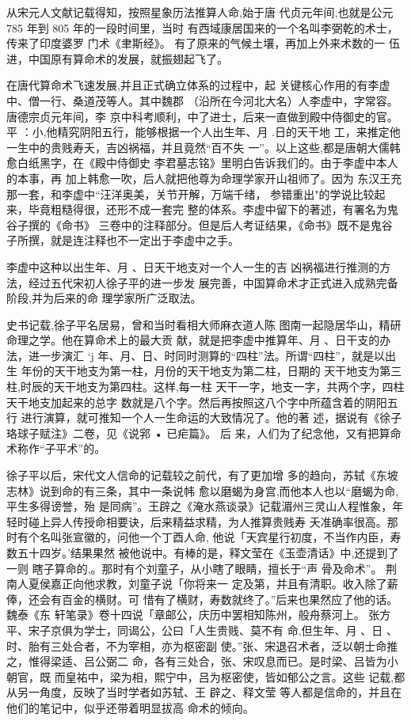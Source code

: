 从宋元人文献记载得知，按照星象历法推算人命,始于唐
代贞元年间,也就是公元 785 年到 805 年的一段时间里，当时
有西域康居国来的一个名叫李弼乾的术士，传来了印度婆罗
门术《聿斯经》。 有了原来的气候土壤，再加上外来术数的一
伍进，中国原有算命术的发展，就振翅起飞了。

在唐代算命术飞速发展,并且正式确立体系的过程中，起
关键核心作用的有李虚中、僧一行、桑道茂等人。其中魏郡
（沿所在今河北大名）人李虚中，字常容。唐德宗贞元年间，李
京中科考顺利，中了进士，后来一直做到殿中侍御史的官。平
：小,他精究阴阳五行，能够根据一个人出生年、月 .日的天干地
工，来推定他一生中的贵贱寿夭，吉凶祸福，并且竟然“百不失
一”。以上这些,都是唐朝大儒韩愈白纸黑字，在《殿中侍御史
李君墓志铭》里明白告诉我们的。由于李虚中本人的本事，再
加上韩愈一吹，后人就把他尊为命理学家开山祖师了。因为
东汉王充那一套，和李虚中“汪洋奥美，关节开解，万端千绪，
参错重出"的学说比较起来，毕竟粗糙得很，还形不成一套完
整的体系。李虚中留下的著述，有署名为鬼谷子撰的《命书》
三卷中的注释部分。但是后人考证结果，《命书》既不是鬼谷
子所撰，就是连注释也不一定出于李虚中之手。

李虚中这种以出生年、月 、日天干地支对一个人一生的吉
凶祸福进行推测的方法，经过五代宋初人徐子平的进一步发
展完善，中国算命术才正式进入成熟完备阶段,并为后来的命
理学家所广泛取法。

史书记载,徐子平名居易，曾和当时看相大师麻衣道人陈
图南一起隐居华山，精研命理之学。他在算命术上的最大贡
献，就是把李虚中推算年、月 、日干支的办法，进一步演汇 ‘j
年、月、日、时同时测算的“四柱”法。所谓“四柱”，就是以出生
年份的天干地支为第一柱，月份的天干地支为第二柱，日期的
天干地支为第三柱,时辰的天干地支为第四柱。这样,每一柱
天干一字，地支一字，共两个字，四柱天干地支加起来的总字
数就是八个字。然后再按照这八个字中所蕴含着的阴阳五行
进行演算，就可推知一个人一生命运的大致情况了。他的著
述，据说有《徐子珞球子赋注》二卷，见《说郛 • 已疟篇》。 后
来，人们为了纪念他，又有把算命术称作“子平术”的。

徐子平以后，宋代文人信命的记载较之前代，有了更加增
多的趋向，苏轼《东坡志林》说到命的有三条，其中一条说帏
愈以磨蝎为身宫,而他本人也以“磨蝎为命,平生多得谤誉，殆
是同病”。王辟之《淹水燕谈录》记载湄州三灵山人程惟象，年
轻时碰上异人传授命相要诀，后来精益求精，为人推算贵贱寿
夭准确率很高。那时有个名叫张宣徽的，问他一个丁酉人命,
他说「天宾星行初度，不当作内臣，寿数五十四岁。'结果果然
被他说中。有棒的是，释文莹在《玉壶清话》中,还提到了一则
瞎子算命的,。那时有个刘童子，从小瞎了眼睛，擅长于“声
骨及命术”。 荆南人夏侯嘉正向他求教，刘童子说「你将来一
定及第，并且有清职。收入除了薪俸，还会有百金的横财。可
惜有了横财，寿数就终了。”后来也果然应了他的话。魏泰《东
轩笔录》卷十四说「章邮公，庆历中罢相知陈州，般舟蔡河上。
张方平、宋子京俱为学士，同谒公，公曰「人生贵贱、莫不有
命,但生年、月 、日 、时、胎有三处合者，不为宰相，亦为枢密副
使。”张、宋退召术者，泛以朝士命推之，惟得梁适、吕公弼二
命，各有三处合，张、宋叹息而已。是时梁、吕皆为小朝官，既
而皇祐中，梁为相，熙宁中，吕为枢密使，皆如郁公之言。这些
记载,都从另一角度，反映了当时学者如苏轼、王 辟之、释文莹
等人都是信命的，并且在他们的笔记中，似乎还带着明显拔高
命术的倾向。

